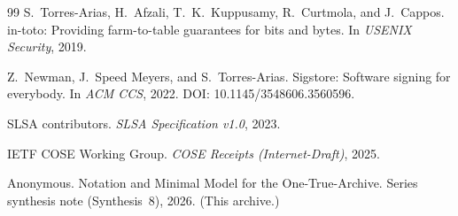 \documentclass[11pt]{article}
\begin{document}
\begin{thebibliography}{99}
S.~Torres-Arias, H.~Afzali, T.~K.~Kuppusamy, R.~Curtmola, and J.~Cappos.
\newblock in-toto: Providing farm-to-table guarantees for bits and bytes.
\newblock In \emph{USENIX Security}, 2019.

Z.~Newman, J.~Speed Meyers, and S.~Torres-Arias.
\newblock Sigstore: Software signing for everybody.
\newblock In \emph{ACM CCS}, 2022. DOI: 10.1145/3548606.3560596.

SLSA contributors.
\newblock \emph{SLSA Specification v1.0}, 2023.

IETF COSE Working Group.
\newblock \emph{COSE Receipts (Internet-Draft)}, 2025.

Anonymous.
\newblock Notation and Minimal Model for the One-True-Archive.
\newblock Series synthesis note (Synthesis~8), 2026. (This archive.)

\end{thebibliography}
\end{document}
